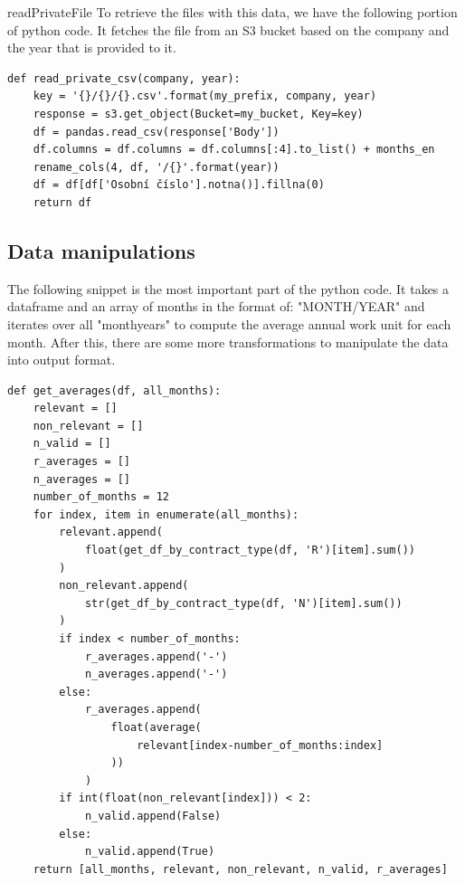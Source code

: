 \documentclass[12pt,oneside]{fithesis2}
\begin{document}
readPrivateFile To retrieve the files with this data, we have the following portion of python code. It fetches the file from an S3 bucket based on the company and the year that is provided to it.

\begin{verbatim}
def read_private_csv(company, year):
    key = '{}/{}/{}.csv'.format(my_prefix, company, year)
    response = s3.get_object(Bucket=my_bucket, Key=key)
    df = pandas.read_csv(response['Body'])
    df.columns = df.columns = df.columns[:4].to_list() + months_en
    rename_cols(4, df, '/{}'.format(year))
    df = df[df['Osobní číslo'].notna()].fillna(0)
    return df
\end{verbatim}

\subsection{Data manipulations}
The following snippet is the most important part of the python code. It takes a dataframe and an array of months in the format of: "MONTH/YEAR" and iterates over all "monthyears" to compute the average annual work unit for each month. After this, there are some more transformations to manipulate the data into output format.

\begin{verbatim}
def get_averages(df, all_months):
    relevant = []
    non_relevant = []
    n_valid = []
    r_averages = []
    n_averages = []
    number_of_months = 12
    for index, item in enumerate(all_months):
        relevant.append(
            float(get_df_by_contract_type(df, 'R')[item].sum())
        )
        non_relevant.append(
            str(get_df_by_contract_type(df, 'N')[item].sum())
        )
        if index < number_of_months:
            r_averages.append('-')
            n_averages.append('-')
        else:
            r_averages.append(
                float(average(
                    relevant[index-number_of_months:index]
                ))
            )
        if int(float(non_relevant[index])) < 2:
            n_valid.append(False)
        else:
            n_valid.append(True)
    return [all_months, relevant, non_relevant, n_valid, r_averages]
\end{verbatim}
\end{document}
